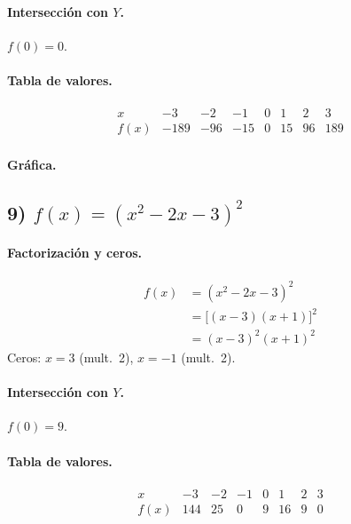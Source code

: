 \documentclass[12pt,a4paper]{article}
\begin{document}
	\paragraph{Intersección con \(Y\).} \(f(0)=0\).
	
	\paragraph{Tabla de valores.}
	\[
	\begin{array}{c|rrrrrrr}
		x & -3 & -2 & -1 & 0 & 1 & 2 & 3\\\hline
		f(x) & -189 & -96 & -15 & 0 & 15 & 96 & 189
	\end{array}
	\]
	
	\paragraph{Gráfica.}
	
	\bigskip
	
	\subsection*{9) \(f(x)=(x^{2}-2x-3)^{2}\)}
	\paragraph{Factorización y ceros.}
	\begin{align*}
		f(x) &= (x^{2}-2x-3)^{2}\\
		&= \bigl[(x-3)(x+1)\bigr]^{2}\\
		&= (x-3)^{2}(x+1)^{2}
	\end{align*}
	Ceros: \(x=3\) (mult.\ 2), \(x=-1\) (mult.\ 2).
	
	\paragraph{Intersección con \(Y\).} \(f(0)=9\).
	
	\paragraph{Tabla de valores.}
	\[
	\begin{array}{c|rrrrrrr}
		x & -3 & -2 & -1 & 0 & 1 & 2 & 3\\\hline
		f(x) & 144 & 25 & 0 & 9 & 16 & 9 & 0
	\end{array}
	\]
	
\end{document}
